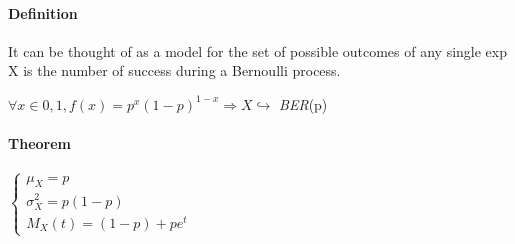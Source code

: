 \paragraph{Definition}
It can be thought of as a model for the set of possible outcomes of any single exp
X is the number of success during a Bernoulli process.
\begin{center}
$\forall x\in {0,1}, f(x)=p^{x}(1-p)^{1-x}\Rightarrow X\hookrightarrow$
\emph{BER}(p)
\end{center}
\paragraph{Theorem}
\begin{center}
$\begin{cases}
\mu_{X}=p\\
\sigma_{X}^{2}=p(1-p)\\
M_{X}(t)=(1-p)+pe^{t}
\end{cases}$
\end{center}
